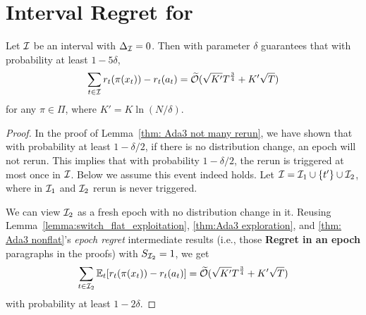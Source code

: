 \section{Interval Regret for \AdaBIN}
\label{appendix:interval_adabin}
\begin{theorem}
Let ${\mathcal{I}}$ be an interval with $\Delta_{\mathcal{I}}=0$. Then \AdaBIN
with parameter $\delta$ guarantees that with probability at least $1-5\delta$,  
\begin{align*}
\sum_{t\in{\mathcal{I}}}r_t(\pi(x_t))-r_t(a_t)=\widetilde{\mathcal{O}}(\sqrt{K'}T^{\frac{3}{4}}+K'\sqrt{T})
\end{align*}
for any $\pi\in\Pi$, where $K'=K\ln(N/\delta)$.
\end{theorem}
\begin{proof}
In the proof of Lemma~\ref{thm: Ada3 not many rerun}, we have shown that with probability at least $1-\delta/2$, if there is no distribution change, an epoch will not rerun. This implies that with probability $1-\delta/2$, the rerun is triggered at most once in ${\mathcal{I}}$. Below we assume this event indeed holds. Let ${\mathcal{I}}={\mathcal{I}}_1\cup\{t'\}\cup{\mathcal{I}}_2$, where in ${\mathcal{I}}_1$ and ${\mathcal{I}}_2$ rerun is never triggered. 

We can view ${\mathcal{I}}_2$ as a fresh epoch with no distribution change in it. Reusing Lemma~\ref{lemma:switch_flat_exploitation}, \ref{thm:Ada3 exploration}, and \ref{thm: Ada3 nonflat}'s \textit{epoch regret} intermediate results (i.e., those \textbf{Regret in an epoch} paragraphs in the proofs) with $S_{{\mathcal{I}}_2}=1$, we get 
\begin{align*}
\sum_{t\in {\mathcal{I}}_2}\mathbb{E}_t[r_t(\pi(x_t))-r_t(a_t)]=\widetilde{\mathcal{O}}(\sqrt{K'}T^{\frac{3}{4}} + K'\sqrt{T})  
\end{align*}
with probability at least $1-2\delta$.


\end{proof}
